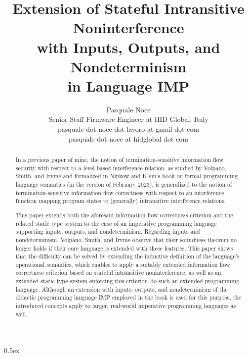 \documentclass[11pt,a4paper,fleqn]{article}
\begin{document}
\title{Extension of Stateful Intransitive Noninterference\\with Inputs, Outputs, and Nondeterminism\\in Language IMP}
\author{Pasquale Noce\\Senior Staff Firmware Engineer at HID Global, Italy\\pasquale dot noce dot lavoro at gmail dot com\\pasquale dot noce at hidglobal dot com}
\maketitle

\begin{abstract}
In a previous paper of mine, the notion of termination-sensitive information flow security with
respect to a level-based interference relation, as studied by Volpano, Smith, and Irvine and
formalized in Nipkow and Klein's book on formal programming language semantics (in the version of
February 2023), is generalized to the notion of termination-sensitive information flow correctness
with respect to an interference function mapping program states to (generally) intransitive
interference relations.

This paper extends both the aforesaid information flow correctness criterion and the related static
type system to the case of an imperative programming language supporting inputs, outputs, and
nondeterminism. Regarding inputs and nondeterminism, Volpano, Smith, and Irvine observe that their
soundness theorem no longer holds if their core language is extended with these features. This paper
shows that the difficulty can be solved by extending the inductive definition of the language's
operational semantics, which enables to apply a suitably extended information flow correctness
criterion based on stateful intransitive noninterference, as well as an extended static type system
enforcing this criterion, to such an extended programming language. Although an extension with
inputs, outputs, and nondeterminism of the didactic programming language IMP employed in the book is
used for this purpose, the introduced concepts apply to larger, real-world imperative programming
languages as well.
\end{abstract}

\tableofcontents

\parindent 0pt\parskip 0.5ex





\end{document}
